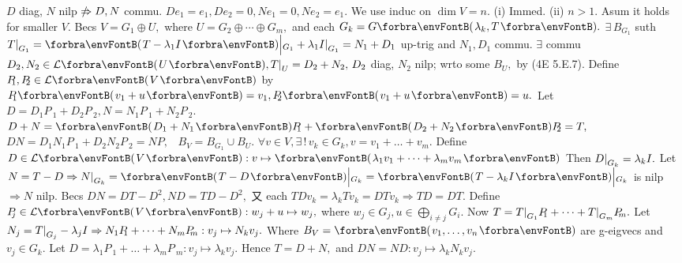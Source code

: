 \ANote $D$ diag, $N$ nilp $\notRightarrow D,N$ commu. \AExa $De_1=e_1,De_2=0,Ne_1=0,Ne_2=e_1.$ %
\vspace{2pt}\parSol{}
We use induc on $\dim V=n.$ (i) Immed. (ii) $n>1.$ Asum it holds for smaller $V.$\parSol{}
Becs $V=G_1\oplus U,$ where $U=G_2\oplus\cdots\oplus G_m,$ and each $G_k=G\Par{\lambda_k,T}.$\parSol{}
$\exists\,B_{G_1}$ suth $T\mmid_{G_1}=\Par{T-\lambda_1I}\Big|{_{G_1}}+\lambda_1I\mmid_{G_1}=N_1+D_1$ up-trig and $N_1,D_1$ commu.\parSol{}
$\exists$ commu $D_2,N_2\in\Lm{U},T\mmid_U=D_2+N_2,\,D_2$ diag, $N_2$ nilp; wrto some $B_U,$ by (4E 5.E.7).\parSol{}
Define $P_{\!\!\!\:1},P_{\!\!\!\:2}\in\Lm{V}$ by $P_{\!\!\!\:1}\Par{v_1+u}=v_1,P_{\!\!\!\:2}\Par{v_1+u}=u.$ Let $D=D_1P_{\!\!\!\:1}+D_2P_{\!\!\!\:2},N=N_1P_{\!\!\!\:1}+N_2P_{\!\!\!\:2}.$\parSol{}
$D+N=\Par{D_1+N_1}P_{\!\!\!\:1}+\Par{D_2+N_2}P_{\!\!\!\:2}=T,$ \, $DN=D_1N_1P_{\!\!\!\:1}+D_2N_2P_{\!\!\!\:2}=NP,$ \, $B_V=B_{G_1}\cup B_U.$\PfEnd\vspace{4pt}\parSol{}
\Or $\forall v\in V,\exists\,!\,v_k\in G_k,v=v_1+\dots+v_m.$ Define $D\in\Lm{V}:v\mapsto\Par{\lambda_1v_1+\dots+\lambda_mv_m}$\parSol{}
Then $D\text{\normalsize|}_{G_k}=\lambda_kI.$ Let $N=T-D\Rightarrow N\mmid_{G_k}=\Par{T-D}\Big|{_{G_k}}=\Par{T-\lambda_kI}\Big|{_{G_k}}$ is nilp $\Rightarrow N$ nilp.\parSol{}
Becs $DN=DT-D^2,ND=TD-D^2,$ 又 each $TDv_k=\lambda_kTv_k=DTv_k\Rightarrow TD=DT.$\PfEnd\vspace{4pt}\parSol{}
\Or Define $P_{\!\!\!\:j}\in\Lm{V}:w_j+u\mapsto w_j,$ where $w_j\in G_j,u\in\bigoplus_{i\neq j}G_i.$\parSol{}
Now $T=T\text{\normalsize|}_{G_1}P_{\!\!\!\:1}+\dots+T\text{\normalsize|}_{G_m}P_{\!\!\!\:m}.$ Let $N_j=T\text{\normalsize|}_{G_j}-\lambda_jI\Rightarrow N_1P_{\!\!\!\:1}+\dots+N_mP_{\!\!\!\:m}:v_j\mapsto N_kv_j.$\parSol{}
Where $B_V=\Par{v_1,\dots,v_n}$ are g-eigvecs and $v_j\in G_k.$ Let $D=\lambda_1P_{\!\!\!\:1}+\dots+\lambda_mP_{\!\!\!\:m}:v_j\mapsto\lambda_kv_j.$\parSol{}
Hence $T=D+N,$ and $DN=ND:v_j\mapsto\lambda_kN_kv_j.$\PfEnd
\SepLine\pagebreak

